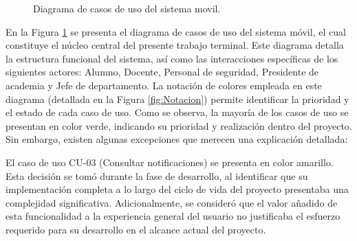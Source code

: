 \begin{figure}[htbp!]
	\begin{center}
		\caption{Diagrama de casos de uso del sistema movil.}
		\label{fig:casosDeUso1}
	\end{center}
\end{figure}

En la Figura \ref{fig:casosDeUso1} se presenta el diagrama de casos de uso del sistema móvil, el cual constituye el núcleo central del presente trabajo terminal. Este diagrama detalla la estructura funcional del sistema, así como las interacciones específicas de los siguientes actores: Alumno, Docente, Personal de seguridad, Presidente de academia y Jefe de departamento. La notación de colores empleada en este diagrama (detallada en la Figura \ref{fig:Notacion}) permite identificar la prioridad y el estado de cada caso de uso.
Como se observa, la mayoría de los casos de uso se presentan en color verde, indicando su prioridad y realización dentro del proyecto. Sin embargo, existen algunas excepciones que merecen una explicación detallada:


El caso de uso CU-03 (Consultar notificaciones) se presenta en color amarillo. Esta decisión se tomó durante la fase de desarrollo, al identificar que su implementación completa a lo largo del ciclo de vida del proyecto presentaba una complejidad significativa. Adicionalmente, se consideró que el valor añadido de esta funcionalidad a la experiencia general del usuario no justificaba el esfuerzo requerido para su desarrollo en el alcance actual del proyecto.


